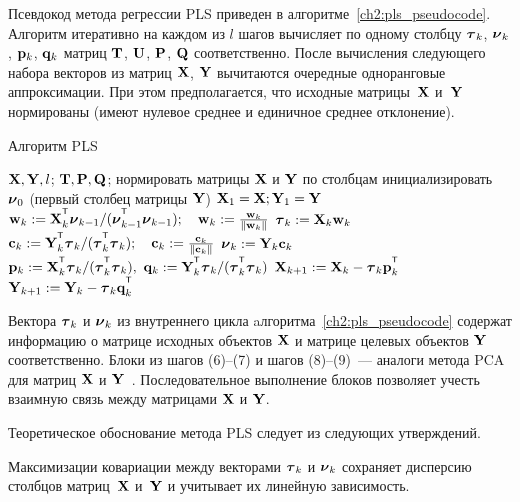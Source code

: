 \documentclass[11pt, a5paper]{dissert}
\begin{document}
Псевдокод метода регрессии PLS приведен в алгоритме~\ref{ch2:pls_pseudocode}.
Алгоритм итеративно на каждом из $l$ шагов вычисляет по одному столбцу $\boldsymbol{\tau}_k$, $\boldsymbol{\nu}_k$, $\mathbf{p}_k$, $\mathbf{q}_k$ матриц $\mathbf{T}$, $\mathbf{U}$, $\mathbf{P}$, $\mathbf{Q}$ соответственно. 
После вычисления следующего набора векторов из матриц $\mathbf{X}$, $\mathbf{Y}$ вычитаются очередные одноранговые аппроксимации. 
При этом предполагается, что исходные матрицы~$\mathbf{X}$ и~$\mathbf{Y}$ нормированы (имеют нулевое среднее и единичное среднее отклонение).

\begin{algorithm}[h]
	\caption{Алгоритм PLS}
	\label{ch2:pls_pseudocode}
	\begin{algorithmic}[1]
		\REQUIRE $\mathbf{X}, \mathbf{Y}, l$;
		\ENSURE $\mathbf{T}, \mathbf{P}, \mathbf{Q}$;
		\STATE нормировать матрицы $\mathbf{X}$ и $\mathbf{Y}$ по столбцам
		\STATE инициализировать $\boldsymbol{\nu}_0$ (первый столбец матрицы $\mathbf{Y}$)
		\STATE $\mathbf{X}_1 = \mathbf{X}; \mathbf{Y}_1 = \mathbf{Y}$
		\REPEAT
		\vspace{0.1cm}
		\STATE $\bw_k := \bX_k^{\T} \bnu_{k-1} / (\bnu_{k-1}^{\T} \bnu_{k-1}); \quad \bw_k: = \frac{\bw_k}{\| \bw_k \|}$
		\vspace{0.1cm}
		\STATE $\boldsymbol{\tau}_k := \mathbf{X}_k \mathbf{w}_k$
		\vspace{0.1cm}
		\STATE $\bc_k := \bY_k^{\T} \btau_k / (\btau_k^{\T} \btau_k); \quad \bc_k: = \frac{\bc_k}{\| \bc_k \|}$
		\vspace{0.1cm}
		\STATE $\boldsymbol{\nu}_k := \mathbf{Y}_k \mathbf{c}_k$
		\vspace{0.1cm}
		\STATE $\bp_k:= \bX_k^{\T}\btau_k/(\btau_k^{\T}\btau_k),\ 
		\bq_k := \bY_k^{\T}\btau_k/(\btau_k^{\T}\btau_k)$
		\vspace{0.2cm}
		\STATE $\bX_{k+1} :=  \bX_k - \btau_k \bp_k^{\T}$
		\vspace{0.2cm}
		\STATE $\bY_{k + 1} :=  \bY_k - \btau_k \bq_k^{\T}$ 
		\ENDFOR
	\end{algorithmic}
\end{algorithm}

Вектора $\boldsymbol{\tau}_k$ и $\boldsymbol{\nu}_k$ из внутреннего цикла aлгоритма~\ref{ch2:pls_pseudocode}
содержат информацию о матрице исходных объектов $\mathbf{X}$ и матрице целевых объектов $\mathbf{Y}$ соответственно. 
Блоки из шагов (6)--(7) и шагов (8)--(9)~--- аналоги метода PCA для матриц $\mathbf{X}$ и $\mathbf{Y}$~\cite{geladi1988pls}. 
Последовательное выполнение блоков позволяет учесть взаимную связь между матрицами $\mathbf{X}$ и $\mathbf{Y}$.

Теоретическое обоснование метода PLS следует из следующих утверждений.
\begin{statement}
	Максимизации ковариации между векторами $\boldsymbol{\tau}_k$ и $\boldsymbol{\nu}_k$ сохраняет дисперсию столбцов матриц~$\mathbf{X}$ и~$\mathbf{Y}$ и учитывает их линейную зависимость.
\end{statement}
\end{document}
